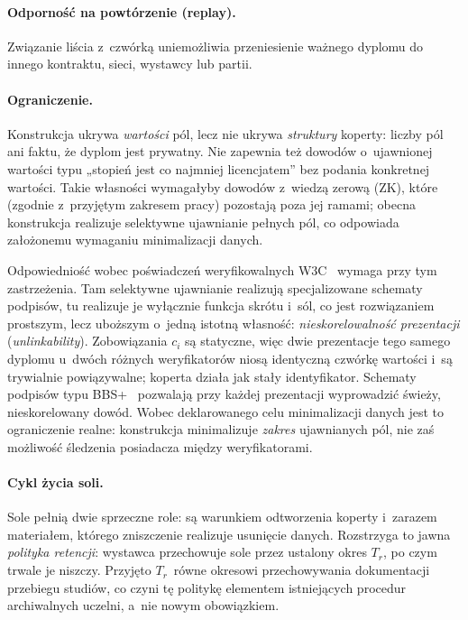 \paragraph{Odporność na powtórzenie (replay).} Związanie liścia z~czwórką
uniemożliwia przeniesienie ważnego
dyplomu do innego kontraktu, sieci, wystawcy lub partii.

\paragraph{Ograniczenie.} Konstrukcja ukrywa \emph{wartości} pól, lecz nie ukrywa
\emph{struktury} koperty: liczby pól ani faktu, że dyplom jest prywatny. Nie
zapewnia też dowodów o~ujawnionej wartości typu „stopień jest co najmniej
licencjatem'' bez podania konkretnej wartości. Takie własności wymagałyby dowodów
z~wiedzą zerową (ZK), które (zgodnie z~przyjętym zakresem pracy) pozostają poza
jej ramami; obecna konstrukcja realizuje selektywne ujawnianie pełnych pól, co
odpowiada założonemu wymaganiu minimalizacji danych.

Odpowiedniość wobec poświadczeń weryfikowalnych W3C~\cite{w3c-vc} wymaga przy tym
zastrzeżenia. Tam selektywne ujawnianie realizują specjalizowane schematy
podpisów, tu realizuje je wyłącznie funkcja skrótu i~sól, co jest rozwiązaniem prostszym,
lecz uboższym o~jedną istotną własność: \emph{nieskorelowalność prezentacji}
(\emph{unlinkability}). Zobowiązania $c_i$ są statyczne, więc dwie prezentacje
tego samego dyplomu u~dwóch różnych weryfikatorów niosą identyczną czwórkę
wartości i~są trywialnie powiązywalne; koperta działa jak stały identyfikator.
Schematy podpisów typu BBS+~\cite{bbs-signatures} pozwalają przy każdej
prezentacji wyprowadzić świeży, nieskorelowany dowód. Wobec deklarowanego celu minimalizacji danych jest to
ograniczenie realne: konstrukcja minimalizuje \emph{zakres} ujawnianych pól, nie
zaś możliwość śledzenia posiadacza między weryfikatorami.

\paragraph{Cykl życia soli.} Sole pełnią dwie sprzeczne role: są warunkiem
odtworzenia koperty i~zarazem materiałem, którego zniszczenie realizuje usunięcie
danych. Rozstrzyga to jawna \emph{polityka retencji}: wystawca przechowuje sole
przez ustalony okres $T_r$, po czym trwale je niszczy. Przyjęto $T_r$~równe
okresowi przechowywania dokumentacji przebiegu studiów, co czyni tę politykę
elementem istniejących procedur archiwalnych uczelni, a~nie nowym obowiązkiem.

